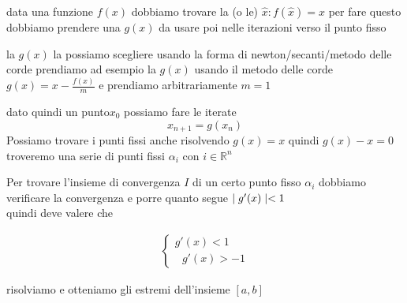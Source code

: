 \documentclass[
]{article}
\begin{document}
data una funzione \(f(x)\) dobbiamo trovare la (o le)
\(\hat{x}: f(\hat{x}) = \hat{x}\) per fare questo dobbiamo prendere una
\(g(x)\) da usare poi nelle iterazioni verso il punto fisso

la \(g(x)\) la possiamo scegliere usando la forma di
newton/secanti/metodo delle corde prendiamo ad esempio la \(g(x)\)
usando il metodo delle corde \(g(x)=x-\frac{f(x)}{m}\) e prendiamo
arbitrariamente \(m = 1\)

dato quindi un punto\(x_{0}\) possiamo fare le iterate
\[x_{n+1} = g(x_{n})\] Possiamo trovare i punti fissi anche risolvendo
\(g(x)=x\) quindi \(g(x) -x = 0\) troveremo una serie di punti fissi
\(\alpha_{i}\) con \(i \in \mathbb{R}^{n}\)

Per trovare l'insieme di convergenza \(I\) di un certo punto fisso
\(\alpha_{i}\) dobbiamo verificare la convergenza e porre quanto segue
\(\mid g'(x) \mid \space <1\)\\
quindi deve valere che

\[
\begin{aligned}
\left\{\begin{matrix}g'(x)<1 \\ \ \ \ g'(x)>-1
\end{matrix}\right.  
\end{aligned}
\]

risolviamo e otteniamo gli estremi dell'insieme \([a,b]\)
\end{document}
